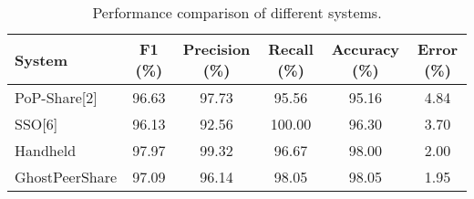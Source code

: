 \begin{table}[b!]
\centering
\begin{tabular}{lccccc}
\hline
\textbf{System} & \textbf{F1 (\%)} & \textbf{Precision (\%)} & \textbf{Recall (\%)} & \textbf{Accuracy (\%)} & \textbf{Error (\%)} \\
\hline
PoP-Share[2]   & 96.63 & 97.73 & 95.56 & 95.16 & 4.84 \\
SSO[6]         & 96.13 & 92.56 & 100.00 & 96.30 & 3.70 \\
Handheld       & 97.97 & 99.32 & 96.67 & 98.00 & 2.00 \\
GhostPeerShare & 97.09 & 96.14 & 98.05 & 98.05 & 1.95 \\
\hline
\end{tabular}
\caption{Performance comparison of different systems.}
\label{table:ann_system_compare}
\end{table}

